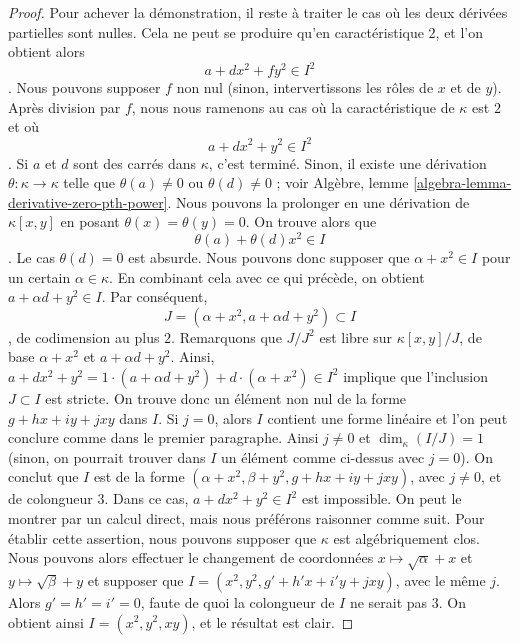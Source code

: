 \begin{proof}
\medskip\noindent Pour achever la démonstration, il reste à traiter le cas où les deux dérivées partielles sont nulles. Cela ne peut se produire qu'en caractéristique $2$, et l'on obtient alors $$
a + d x^2 + f y^2 \in I^2
$$. Nous pouvons supposer $f$ non nul (sinon, intervertissons les rôles de $x$ et de $y$). Après division par $f$, nous nous ramenons au cas où la caractéristique de $\kappa$ est $2$ et où $$
a + d x^2 + y^2 \in I^2
$$. Si $a$ et $d$ sont des carrés dans $\kappa$, c'est terminé. Sinon, il existe une dérivation $\theta : \kappa \to \kappa$ telle que $\theta(a) \not = 0$ ou $\theta(d) \not = 0$ ; voir Algèbre, lemme \ref{algebra-lemma-derivative-zero-pth-power}. Nous pouvons la prolonger en une dérivation de $\kappa[x, y]$ en posant $\theta(x) = \theta(y) = 0$. On trouve alors que $$
\theta(a) + \theta(d) x^2 \in I
$$. Le cas $\theta(d) = 0$ est absurde. Nous pouvons donc supposer que $\alpha + x^2 \in I$ pour un certain $\alpha \in \kappa$. En combinant cela avec ce qui précède, on obtient $a + \alpha d + y^2 \in I$. Par conséquent, $$
J = (\alpha + x^2, a + \alpha d + y^2) \subset I
$$, de codimension au plus $2$. Remarquons que $J/J^2$ est libre sur $\kappa[x, y]/J$, de base $\alpha + x^2$ et $a + \alpha d + y^2$. Ainsi, $a + d x^2 + y^2 =
1 \cdot (a + \alpha d + y^2) + d \cdot (\alpha + x^2) \in I^2$ implique que l'inclusion $J \subset I$ est stricte. On trouve donc un élément non nul de la forme $g + hx + iy + jxy$ dans $I$. Si $j = 0$, alors $I$ contient une forme linéaire et l'on peut conclure comme dans le premier paragraphe. Ainsi $j \not = 0$ et $\dim_\kappa(I/J) = 1$ (sinon, on pourrait trouver dans $I$ un élément comme ci-dessus avec $j = 0$). On conclut que $I$ est de la forme $(\alpha + x^2, \beta + y^2, g + hx + iy + jxy)$, avec $j \not = 0$, et de colongueur $3$. Dans ce cas, $a + dx^2 + y^2 \in I^2$ est impossible. On peut le montrer par un calcul direct, mais nous préférons raisonner comme suit. Pour établir cette assertion, nous pouvons supposer que $\kappa$ est algébriquement clos. Nous pouvons alors effectuer le changement de coordonnées $x \mapsto \sqrt{\alpha} + x$ et $y \mapsto \sqrt{\beta} + y$ et supposer que $I = (x^2, y^2, g' + h'x + i'y + jxy)$, avec le même $j$. Alors $g' = h' = i' = 0$, faute de quoi la colongueur de $I$ ne serait pas $3$. On obtient ainsi $I = (x^2, y^2, xy)$, et le résultat est clair. \end{proof}

